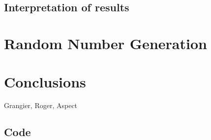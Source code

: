 \documentclass[10pt, final]{article}
\begin{document}
\begin{multicols}{2}
    

\subsection*{Interpretation of results}

\section{Random Number Generation}


\section*{Conclusions}


\begin{thebibliography}{99}
   Grangier, Roger, Aspect
\end{thebibliography}
\end{multicols}




\hrulefill
\subsection*{Code}
\end{document}
